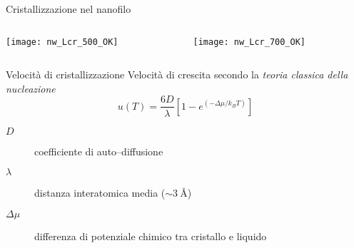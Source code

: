 \documentclass{beamer}
\begin{document}
\begin{frame}{Cristallizzazione nel nanofilo}
  \begin{columns}
   \begin{column}{0.5\textwidth}
    \texttt{[image: nw\_Lcr\_500\_OK]}
   \end{column}
   \begin{column}{0.5\textwidth}
    \texttt{[image: nw\_Lcr\_700\_OK]}
   \end{column}
  \end{columns}
  \begin{table}[h]
  \end{table}

\end{frame}




\begin{frame}{Velocità di cristallizzazione}
 Velocità di crescita secondo la \emph{teoria classica della nucleazione}
  \begin{equation*}
    u(T)= \frac{6D}{\lambda} \left[ 1- e^{ \left( -\Delta\mu/k_B T\right) } \right]
  \end{equation*}
  \begin{center}
  \begin{description}
   \item [$D$] coefficiente di auto--diffusione
   \item [$\lambda$] distanza interatomica media ($\sim \SI{3}{\angstrom}$)
   \item [$\Delta\mu$] differenza di potenziale chimico tra cristallo e liquido
  \end{description}  
  \end{center}
\end{frame}
\end{document}
